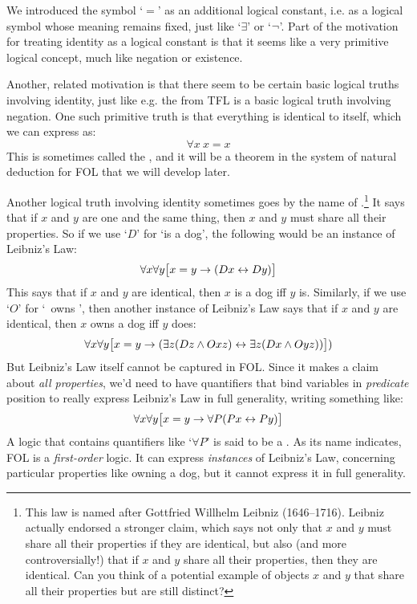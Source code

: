 We introduced the symbol `$=$' as an additional logical constant, i.e. as a logical symbol whose meaning remains fixed, just like `$\exists$' or `$\neg$'.  Part of the motivation for treating identity as a logical constant is that it seems like a very primitive logical concept, much like negation or existence.

Another, related motivation is that there seem to be certain basic logical truths involving identity, just like e.g. the  from TFL  is a basic logical truth involving negation.  One such primitive truth is that everything is identical to itself, which we can express as:
$$\forall x\ x= x$$
This is sometimes called the , and it will be a theorem in the system of natural deduction for FOL that we will develop later.

Another logical truth involving identity sometimes goes by the name of .\footnote{This law is named after Gottfried Willhelm Leibniz (1646--1716).  Leibniz actually endorsed a stronger claim, which says not only that $x$ and $y$ must share all their properties if they are identical, but also (and more controversially!) that if $x$ and $y$ share all their properties, then they are identical.  Can you think of a potential example of objects $x$ and $y$ that share all their properties but are still distinct?}  It says that if $x$ and $y$ are one and the same thing, then $x$ and $y$ must share all their properties. So if we use `$D$' for `\blank is a dog', the following would be an instance of Leibniz's Law:
$$\forall x \forall y\bigl[x = y \rightarrow (Dx \leftrightarrow Dy)\bigr]$$
This says that if $x$ and $y$ are identical, then $x$ is a dog iff $y$ is.  Similarly, if we use `$O$' for `\blank\ owns \blank', then another instance of Leibniz's Law says that if $x$ and $y$ are identical, then $x$ owns a dog iff $y$ does:
$$\forall x \forall y\bigl[x = y \rightarrow (\exists z(Dz \wedge Oxz) \leftrightarrow \exists z(Dx \wedge Oyz))\bigr])$$
But Leibniz's Law itself cannot be captured in FOL.  Since it makes a claim about \emph{all properties}, we'd need to have quantifiers that bind variables in \emph{predicate} position to really express Leibniz's Law in full generality, writing something like:
$$\forall x \forall y\bigl[x = y \rightarrow \forall P(Px \leftrightarrow Py)\bigr]$$
A logic that contains quantifiers like `$\forall P$' is said to be a .  As its name indicates, FOL is a \emph{first-order} logic.  It can express  \emph{instances} of Leibniz's Law, concerning particular properties like owning a dog, but it cannot express it in full generality.

